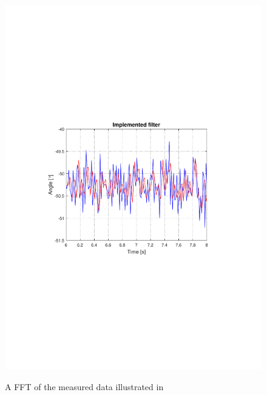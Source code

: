\begin{figure}[H]
  \centering
  {
    \includegraphics[width=1.1\textwidth]{figures/ImplementedFilter.pdf}
  }
  \caption{A FFT of the measured data illustrated in }
  \label{fig:discretetimebodeplot}
\end{figure}
